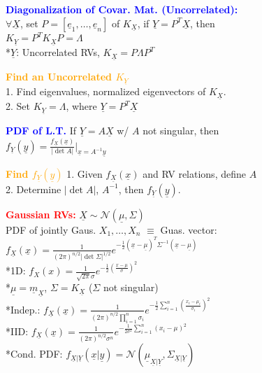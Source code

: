 \documentclass[5pt]{extarticle} %
\begin{document}
\begin{paracol}{3}
{    \textcolor{blue}{\textbf{Diagonalization of Covar. Mat. (Uncorrelated):}} \\
    $\forall \underline{X}$, set $P = [\underline{e}_1, \ldots, \underline{e}_n]$ of $K_{\underline{X}}$, if $\underline{Y} = P^T \underline{X}$, then \\
    $K_{\underline{Y}} = P^T K_{\underline{X}} P = \Lambda$ \\
    *$\underline{Y}$: Uncorrelated RVs, $K_{\underline{X}} = P \Lambda P^T$

    \textcolor{orange}{\textbf{Find an Uncorrelated $K_{\underline{Y}}$}} \\
    1. Find eigenvalues, normalized eigenvectors of $K_{\underline{X}}$. \\
    2. Set $K_{\underline{Y}} = \Lambda$, where $\underline{Y} = P^T \underline{X}$

    \textcolor{blue}{\textbf{PDF of L.T.}} If $\underline{Y} = A \underline{X}$ w/ $A$ not singular, then \\
    $f_{\underline{Y}} (\underline{y}) = \frac{f_{\underline{X}} (\underline{x})}{|\det A|} \Big|_{\underline{x} = A^{-1} \underline{y}}$

    \textcolor{orange}{\textbf{Find $f_{\underline{Y}} (\underline{y})$}} 1. Given $f_{\underline{X}} (\underline{x})$ and RV relations, define $A$ \\
    2. Determine $|\det A|$, $A^{-1}$, then $f_{\underline{Y}} (\underline{y})$.

    \textcolor{red}{\textbf{Gaussian RVs:}} $\underline{X} \sim \mathcal{N} (\underline{\mu}, \Sigma)$ \\ 
    PDF of jointly Gaus. $X_1, \ldots, X_n$ $\equiv$ Guas. vector: \\
    $f_{\underline{X}} (\underline{x}) = \frac{1}{(2\pi)^{n/2} |\det \Sigma|^{1/2}} e^{-\frac{1}{2} (\underline{x} - \underline{\mu})^T \Sigma^{-1} (\underline{x} - \underline{\mu})}$ \\ 
    *1D: $f_X(x) = \frac{1}{\sqrt{2\pi} \sigma} e^{-\frac{1}{2} \left( \frac{x - \mu}{\sigma} \right)^2}$ \\
    *$\underline{\mu} = \underline{m}_{\underline{X}}$, $\Sigma = K_{\underline{X}}$ ($\Sigma$ not singular) \\
    *Indep.: $f_{\underline{X}} (\underline{x}) = \frac{1}{(2\pi)^{n/2} \prod_{i=1}^n \sigma_i} e^{-\frac{1}{2} \sum_{i=1}^n \left( \frac{x_i - \mu_i}{\sigma_i} \right)^2}$ \\
    *IID: $f_{\underline{X}} (\underline{x}) = \frac{1}{(2\pi)^{n/2} \sigma^n} e^{-\frac{1}{2\sigma^2} \sum_{i=1}^n (x_i - \mu)^2}$ \\
    *Cond. PDF: $f_{\underline{X} | \underline{Y}} (\underline{x} | \underline{y}) = \mathcal{N} (\underline{\mu}_{\underline{X} | \underline{Y}}, \Sigma_{\underline{X} | \underline{Y}})$

}
\end{paracol}
\end{document}
